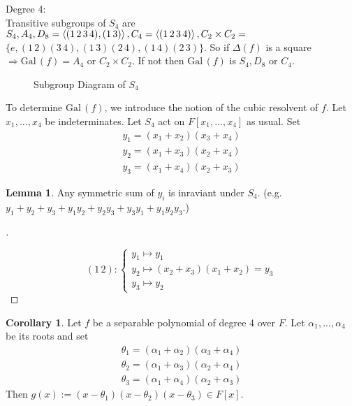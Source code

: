 \documentclass{article}
\theoremstyle{definition}
\newtheorem{lem}{Lemma}
\newtheorem{cor}{Corollary}
\newenvironment{proofs}[1][\proofname]{%
  \begin{proof}[#1]$ $\par\nobreak\ignorespaces
}{%
  \end{proof}
}
\newcommand{\Ra}{\Rightarrow}
\newcommand{\Gal}{\text{Gal}\,}
\begin{document}
\par Degree 4:\\
Transitive subgroups of $S_4$ are $S_4, A_4, D_8 = \ev{(1 \, 2 \, 3 \, 4), (1 \, 3)}, C_4 = \ev{(1 \, 2 \, 3 \, 4)}, C_2 \times C_2 = $ \\
$\{e, (1 \, 2) (3 \, 4), (1 \, 3) (2 \, 4), (1 \, 4) (2 \, 3)\}$.
So if $\Delta(f)$ is a square $\Ra \Gal(f) = A_4$ or $C_2 \times C_2$.
If not then $\Gal(f)$ is $S_4, D_8$ or $C_4$.

\begin{figure}[H]
	\centering
	\caption{Subgroup Diagram of $S_4$}
\end{figure}

\par To determine $\Gal(f)$, we introduce the notion of the cubic resolvent of $f$.
Let $x_1, ..., x_4$ be indeterminates.
Let $S_4$ act on $F[x_1, ..., x_4]$ as usual.
Set 
\[
	\begin{split}
		y_1 = (x_1 + x_2) (x_3 + x_4)\\
		y_2 = (x_1 + x_3) (x_2 + x_4)\\
		y_3 = (x_1 + x_4) (x_2 + x_3)
	\end{split}
\]

\begin{lem}
	Any symmetric sum of $y_i$ is inraviant under $S_4$.
	(e.g. $y_1 + y_2 + y_3 + y_1 y_2 + y_2 y_3 + y_3 y_1 + y_1 y_2 y_3$.)
\end{lem}

\begin{proofs}
	\[
		(1 \, 2): 
		\begin{cases}
			y_1 \mapsto y_1\\
			y_2 \mapsto (x_2 + x_3) (x_1 + x_2) = y_3\\
			y_3 \mapsto y_2
		\end{cases}
	\]
\end{proofs}

\begin{cor}
	Let $f$ be a separable polynomial of degree 4 over $F$.
	Let $\alpha_1, ..., \alpha_4$ be its roots and set
	\[
		\begin{split}
			\theta_1 = (\alpha_1 + \alpha_2) (\alpha_3 + \alpha_4)\\
			\theta_2 = (\alpha_1 + \alpha_3) (\alpha_2 + \alpha_4)\\
			\theta_3 = (\alpha_1 + \alpha_4) (\alpha_2 + \alpha_3)
		\end{split}
	\]
	Then $g(x) := (x - \theta_1) (x - \theta_2) (x - \theta_3) \in F[x]$.
\end{cor}
\end{document}
